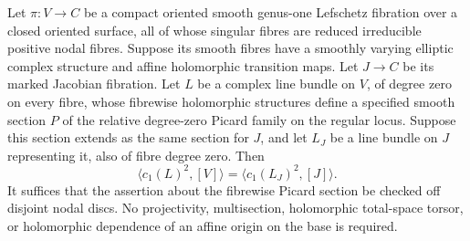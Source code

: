 \begin{lemma}
Let $\pi:V\to C$ be a compact oriented smooth genus-one Lefschetz
fibration over a closed oriented surface, all of whose singular fibres
are reduced irreducible positive nodal fibres.  Suppose its smooth
fibres have a smoothly varying elliptic complex structure and affine
holomorphic transition maps.  Let $J\to C$ be its marked Jacobian
fibration.  Let $L$ be a complex line bundle on $V$, of degree zero on
every fibre, whose fibrewise holomorphic structures define a specified
smooth section $P$ of the relative degree-zero Picard family on the
regular locus.  Suppose this section extends as the same section for
$J$, and let $L_J$ be a line bundle on $J$ representing it, also of
fibre degree zero.  Then
\[
 \langle c_1(L)^2,[V]\rangle
       =\langle c_1(L_J)^2,[J]\rangle.
\]
It suffices that the assertion about the fibrewise Picard section be
checked off disjoint nodal discs.  No projectivity, multisection,
holomorphic total-space torsor, or holomorphic dependence of an affine
origin on the base is required.
\end{lemma}
